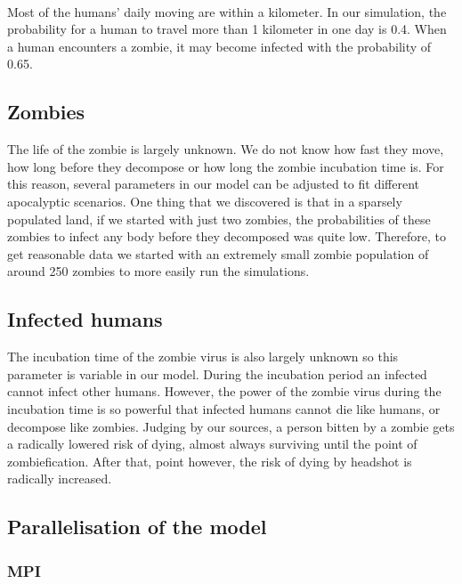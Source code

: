 \documentclass{report}
\begin{document}
\paragraph{}
Most of the humans' daily moving are within a kilometer. In our simulation, the probability for a human to travel more than 1 kilometer in one day is 0.4. When a human encounters a zombie, it may become infected with the probability of 0.65.

\subsection{Zombies}
The life of the zombie is largely unknown. We do not know how fast they move, how long before they decompose or how long the zombie incubation time is. For this reason, several parameters in our model can be adjusted to fit different apocalyptic scenarios. One thing that we discovered is that in a sparsely populated land, if we started with just two zombies, the probabilities of these zombies to infect any body before they decomposed was quite low. Therefore, to get reasonable data we started with an extremely small zombie population of around 250 zombies to more easily run the simulations.

\subsection{Infected humans}
The incubation time of the zombie virus is also largely unknown so this parameter is variable in our model. During the incubation period an infected cannot infect other humans. However, the power of the zombie virus during the incubation time is so powerful that infected humans cannot die like humans, or decompose like zombies. Judging by our sources\cite{deadheads}, a person bitten by a zombie gets a radically lowered risk of dying, almost always surviving until the point of zombiefication. After that, point however, the risk of dying by headshot is radically increased.

\subsection{Parallelisation of the model}
\subsubsection{MPI}
\end{document}
